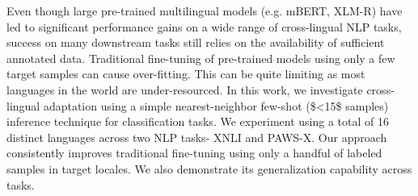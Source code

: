 Even though large pre-trained multilingual models (e.g. mBERT, XLM-R) have led to significant performance gains on a wide range of cross-lingual NLP tasks, success on many downstream tasks still relies on the availability of sufficient annotated data. Traditional fine-tuning of pre-trained models using only a few target samples can cause over-fitting. This can be quite limiting as most languages in the world are under-resourced. In this work, we investigate cross-lingual adaptation using a simple nearest-neighbor few-shot (\$<15\$ samples) inference technique for classification tasks. We experiment using a total of 16 distinct languages across two NLP tasks- XNLI and PAWS-X. Our approach consistently improves traditional fine-tuning using only a handful of labeled samples in target locales. We also demonstrate its generalization capability across tasks.

